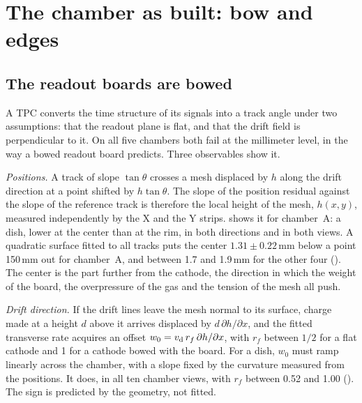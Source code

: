 \section{The chamber as built: bow and edges}\label{sec:asbuilt}

\subsection{The readout boards are bowed}\label{sec:bow}
A TPC converts the time structure of its signals into a track angle under two assumptions: that the readout plane is
flat, and that the drift field is perpendicular to it. On all five chambers both fail at the millimeter level, in the
way a bowed readout board predicts. Three observables show it.

\emph{Positions.} A track of slope $\tan\theta$ crosses a mesh displaced by $h$ along the drift direction at a point
shifted by $h\tan\theta$. The slope of the position residual against the slope of the reference track is therefore the
local height of the mesh, $h(x,y)$, measured independently by the X and the Y strips.  shows it
for chamber~A: a dish, lower at the center than at the rim, in both directions and in both views. A quadratic surface
fitted to all tracks puts the center $1.31\pm0.22$\,mm below a point 150\,mm out for chamber~A, and between 1.7 and
1.9\,mm for the other four (). The center is the part further from the cathode, the direction in which
the weight of the board, the overpressure of the gas and the tension of the mesh all push.

\emph{Drift direction.} If the drift lines leave the mesh normal to its surface, charge made at a height $d$ above it
arrives displaced by $d\,\partial h/\partial x$, and the fitted transverse rate acquires an offset
$w_0=v_\mathrm{d}\,r_f\,\partial h/\partial x$, with $r_f$ between $1/2$ for a flat cathode and 1 for a cathode bowed with the
board. For a dish, $w_0$ must ramp linearly across the chamber, with a slope fixed by the curvature measured from the
positions. It does, in all ten chamber views, with $r_f$ between 0.52 and 1.00 (). The sign is
predicted by the geometry, not fitted.

